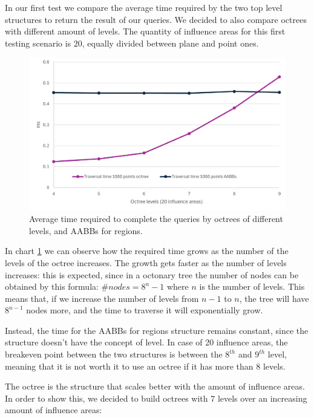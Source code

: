 \documentclass{PoliMi_MasterThesis}
\begin{document}
In our first test we compare the average time required by the two top level structures to return the result of our queries. We decided to also compare octrees with different amount of levels. The quantity of influence areas for this first testing scenario is $20$, equally divided between plane and point ones.

\begin{figure}[H] 
	\centering
	\includegraphics[width=\textwidth]{Images/octree_vs_aabbs_traversal_chart.png}
	\caption{Average time required to complete the queries by octrees of different levels, and AABBs for regions.}
	\label{fig:octree_vs_aabbs_traversal_chart}
\end{figure}

In chart \ref{fig:octree_vs_aabbs_traversal_chart} we can observe how the required time grows as the number of the levels of the octree increases. The growth gets faster as the number of levels increases: this is expected, since in a octonary tree the number of nodes can be obtained by this formula: $\#nodes = 8^n-1$ where $n$ is the number of levels. This means that, if we increase the number of levels from $n-1$ to $n$, the tree will have $8^{n-1}$ nodes more, and the time to traverse it will exponentially grow.

Instead, the time for the AABBs for regions structure remains constant, since the structure doesn't have the concept of level. In case of 20 influence areas, the breakeven point between the two structures is between the $8^{th}$ and $9^{th}$ level, meaning that it is not worth it to use an octree if it has more than $8$ levels.

The octree is the structure that scales better with the amount of influence areas. In order to show this, we decided to build octrees with $7$ levels over an increasing amount of influence areas:
\end{document}
